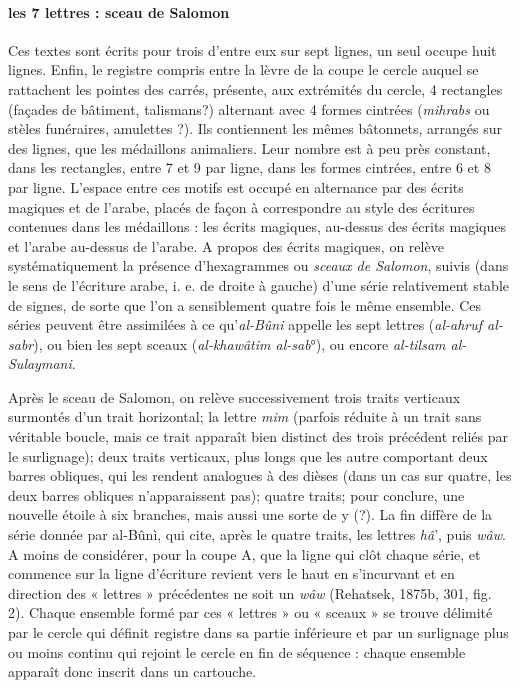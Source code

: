 \paragraph{les 7 lettres : sceau de Salomon} Ces textes sont écrits pour trois d'entre eux sur sept lignes, un seul occupe huit lignes. Enfin, le registre compris entre la lèvre de la coupe le cercle auquel se rattachent les pointes des carrés, présente, aux extrémités du cercle, 4 rectangles (façades de bâtiment, talismans?) alternant avec  4 formes cintrées (\textit{mihrabs} ou stèles funéraires, amulettes ?). Ils contiennent les mêmes bâtonnets, arrangés sur des lignes, que les médaillons animaliers. Leur nombre est à peu près constant, dans les rectangles, entre 7 et 9 par ligne, dans les formes cintrées, entre 6 et 8 par ligne. L'espace entre ces motifs est occupé en alternance par des écrits magiques et de l'arabe, placés de façon à correspondre au style des écritures contenues dans les médaillons : les écrits magiques, au-dessus des écrits magiques et l'arabe au-dessus de l'arabe. A propos des écrits magiques, on relève systématiquement la présence d'hexagrammes ou \textit{sceaux de Salomon}, suivis (dans le sens de l'écriture arabe, i. e. de droite à gauche) d'une série relativement stable de signes, de sorte que l'on a sensiblement quatre fois le même ensemble. Ces séries peuvent être assimilées à ce qu'\textit{al-Bûni} appelle les sept lettres (\textit{al-ahruf al-sabr}), ou bien les
sept sceaux (\textit{al-khawâtim al-sab}°), ou encore \textit{al-tilsam al-Sulaymani}. 

Après le sceau de Salomon, on relève successivement trois traits verticaux
surmontés d'un trait horizontal; la lettre \textit{mim} (parfois réduite à un trait sans véritable boucle, mais ce trait apparaît bien distinct des trois précédent reliés par le surlignage); deux traits verticaux, plus longs que les autre comportant deux barres obliques, qui les rendent analogues à des dièses (dans un cas sur quatre, les deux barres obliques n'apparaissent pas); quatre traits; pour conclure, une nouvelle étoile à six branches, mais aussi une sorte de y (?). La fin diffère de la série donnée par al-Bûnì, qui cite, après le quatre traits, les lettres \textit{\textit{hâ}}', puis \textit{wâw}. A moins de considérer, pour la coupe A, que la ligne qui clôt chaque série, et commence sur la ligne d'écriture revient vers le haut en s'incurvant et en direction des « lettres » précédentes ne soit un \textit{wâw} (Rehatsek, 1875b, 301, fig. 2). Chaque ensemble formé par ces « lettres » ou « sceaux » se trouve délimité par le cercle qui définit registre dans sa partie inférieure et par un surlignage plus ou moins continu qui rejoint le cercle en fin de séquence : chaque ensemble apparaît donc inscrit dans un cartouche. 

